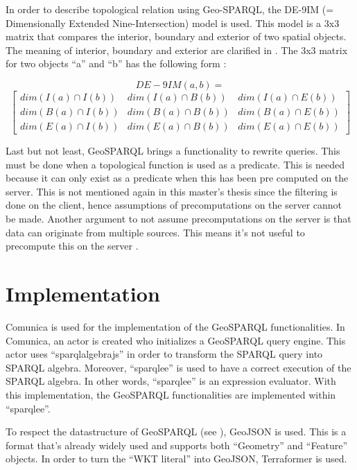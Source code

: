 \documentclass[twocolumn]{phdsymp} %
\begin{document}
In order to describe topological relation using Geo-SPARQL, the DE-9IM (= Dimensionally Extended Nine-Intersection) model is used. This model is a 3x3 matrix that compares the interior, boundary and exterior of two spatial objects. The meaning of interior, boundary and exterior are clarified in . The 3x3 matrix for two objects ``a'' and ``b'' has the following form \cite{shen2018classification}:

\begin{equation*}
    DE-9IM(a,b) = 
\end{equation*}
\begin{equation*}
    \begin{bmatrix}
        dim(I(a)\cap I(b)) & dim(I(a)\cap B(b)) & dim(I(a)\cap E(b))\\
        dim(B(a)\cap I(b)) & dim(B(a)\cap B(b)) & dim(B(a)\cap E(b))\\
        dim(E(a)\cap I(b)) & dim(E(a)\cap B(b)) & dim(E(a)\cap E(b))
    \end{bmatrix}
\end{equation*}

Last but not least, GeoSPARQL brings a functionality to rewrite queries. This must be done when a topological function is used as a predicate. This is needed because it can only exist as a predicate when this has been pre computed on the server. This is not mentioned again in this master's thesis since the filtering is done on the client, hence assumptions of precomputations on the server cannot be made. Another argument to not assume precomputations on the server is that data can originate from multiple sources. This means it's not useful to precompute this on the server \cite{ogcdocs}.

\section{Implementation}
Comunica is used for the implementation of the GeoSPARQL functionalities. In Comunica, an actor is created who initializes a GeoSPARQL query engine. This actor uses ``sparqlalgebrajs'' in order to transform the SPARQL query into SPARQL algebra. Moreover, ``sparqlee'' is used to have a correct execution of the SPARQL algebra. In other words, ``sparqlee'' is an expression evaluator. With this implementation, the GeoSPARQL functionalities are implemented within ``sparqlee''. 

To respect the datastructure of GeoSPARQL (see ), GeoJSON is used. This is a format that's already widely used and supports both ``Geometry'' and ``Feature'' objects. In order to turn the ``WKT literal'' into GeoJSON, Terraformer is used.
\end{document}

